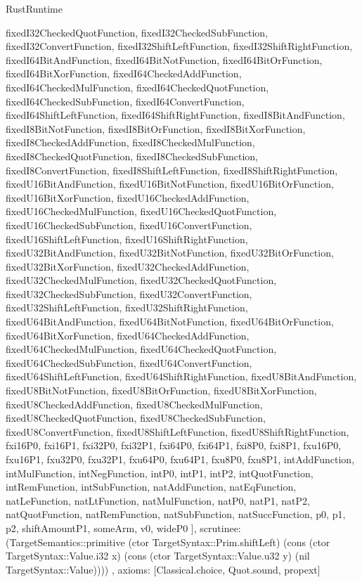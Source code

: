 \begin{lexlean}{RustRuntime}
\begin{semanticmodule}
{{      fixedI32CheckedQuotFunction,
      fixedI32CheckedSubFunction,
      fixedI32ConvertFunction,
      fixedI32ShiftLeftFunction,
      fixedI32ShiftRightFunction,
      fixedI64BitAndFunction,
      fixedI64BitNotFunction,
      fixedI64BitOrFunction,
      fixedI64BitXorFunction,
      fixedI64CheckedAddFunction,
      fixedI64CheckedMulFunction,
      fixedI64CheckedQuotFunction,
      fixedI64CheckedSubFunction,
      fixedI64ConvertFunction,
      fixedI64ShiftLeftFunction,
      fixedI64ShiftRightFunction,
      fixedI8BitAndFunction,
      fixedI8BitNotFunction,
      fixedI8BitOrFunction,
      fixedI8BitXorFunction,
      fixedI8CheckedAddFunction,
      fixedI8CheckedMulFunction,
      fixedI8CheckedQuotFunction,
      fixedI8CheckedSubFunction,
      fixedI8ConvertFunction,
      fixedI8ShiftLeftFunction,
      fixedI8ShiftRightFunction,
      fixedU16BitAndFunction,
      fixedU16BitNotFunction,
      fixedU16BitOrFunction,
      fixedU16BitXorFunction,
      fixedU16CheckedAddFunction,
      fixedU16CheckedMulFunction,
      fixedU16CheckedQuotFunction,
      fixedU16CheckedSubFunction,
      fixedU16ConvertFunction,
      fixedU16ShiftLeftFunction,
      fixedU16ShiftRightFunction,
      fixedU32BitAndFunction,
      fixedU32BitNotFunction,
      fixedU32BitOrFunction,
      fixedU32BitXorFunction,
      fixedU32CheckedAddFunction,
      fixedU32CheckedMulFunction,
      fixedU32CheckedQuotFunction,
      fixedU32CheckedSubFunction,
      fixedU32ConvertFunction,
      fixedU32ShiftLeftFunction,
      fixedU32ShiftRightFunction,
      fixedU64BitAndFunction,
      fixedU64BitNotFunction,
      fixedU64BitOrFunction,
      fixedU64BitXorFunction,
      fixedU64CheckedAddFunction,
      fixedU64CheckedMulFunction,
      fixedU64CheckedQuotFunction,
      fixedU64CheckedSubFunction,
      fixedU64ConvertFunction,
      fixedU64ShiftLeftFunction,
      fixedU64ShiftRightFunction,
      fixedU8BitAndFunction,
      fixedU8BitNotFunction,
      fixedU8BitOrFunction,
      fixedU8BitXorFunction,
      fixedU8CheckedAddFunction,
      fixedU8CheckedMulFunction,
      fixedU8CheckedQuotFunction,
      fixedU8CheckedSubFunction,
      fixedU8ConvertFunction,
      fixedU8ShiftLeftFunction,
      fixedU8ShiftRightFunction,
      fxi16P0,
      fxi16P1,
      fxi32P0,
      fxi32P1,
      fxi64P0,
      fxi64P1,
      fxi8P0,
      fxi8P1,
      fxu16P0,
      fxu16P1,
      fxu32P0,
      fxu32P1,
      fxu64P0,
      fxu64P1,
      fxu8P0,
      fxu8P1,
      intAddFunction,
      intMulFunction,
      intNegFunction,
      intP0,
      intP1,
      intP2,
      intQuotFunction,
      intRemFunction,
      intSubFunction,
      natAddFunction,
      natEqFunction,
      natLeFunction,
      natLtFunction,
      natMulFunction,
      natP0,
      natP1,
      natP2,
      natQuotFunction,
      natRemFunction,
      natSubFunction,
      natSuccFunction,
      p0,
      p1,
      p2,
      shiftAmountP1,
      someArm,
      v0,
      wideP0
    ],
    scrutinee: (TargetSemantics::primitive (ctor TargetSyntax::Prim.shiftLeft) (cons (ctor TargetSyntax::Value.i32 x) (cons (ctor TargetSyntax::Value.u32 y) (nil TargetSyntax::Value))))
  },
  axioms: [Classical.choice, Quot.sound, propext]
}


\end{semanticmodule}
\end{lexlean}
